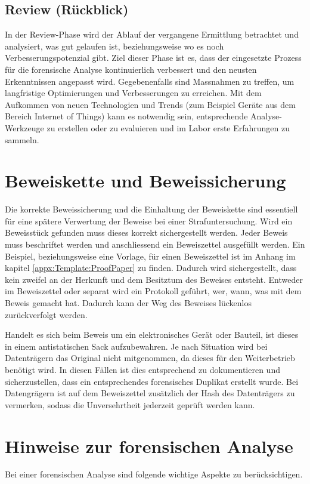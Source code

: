 \subsection{Review (Rückblick)}
In der Review-Phase wird der Ablauf der vergangene Ermittlung betrachtet und analysiert, was gut gelaufen ist, beziehungsweise wo es noch Verbesserungspotenzial gibt. Ziel dieser Phase ist es, dass der eingesetzte Prozess für die forensische Analyse kontinuierlich verbessert und den neusten Erkenntnissen angepasst wird. Gegebenenfalls sind Massnahmen zu treffen, um langfristige Optimierungen und Verbesserungen zu erreichen. Mit dem Aufkommen von neuen Technologien und Trends (zum Beispiel Geräte aus dem Bereich Internet of Things) kann es notwendig sein, entsprechende Analyse-Werkzeuge zu erstellen oder zu evaluieren und im Labor erste Erfahrungen zu sammeln.

\section{Beweiskette und Beweissicherung}
Die korrekte Beweissicherung und die Einhaltung der Beweiskette sind essentiell für eine spätere Verwertung der Beweise bei einer Strafuntersuchung. Wird ein Beweisstück gefunden muss dieses korrekt sichergestellt werden. Jeder Beweis muss beschriftet werden und anschliessend ein Beweiszettel ausgefüllt werden. Ein Beispiel, beziehungsweise eine Vorlage, für einen Beweiszettel ist im Anhang im kapitel \ref{appx:Template:ProofPaper}  zu finden. Dadurch wird sichergestellt, dass kein zweifel an der Herkunft und dem Besitztum des Beweises entsteht. Entweder im Beweiszettel oder separat wird ein Protokoll geführt, wer, wann, was mit dem Beweis gemacht hat. Dadurch kann der Weg des Beweises lückenlos zurückverfolgt werden.

Handelt es sich beim Beweis um ein elektronisches Gerät oder Bauteil, ist dieses in einem antistatischen Sack aufzubewahren. Je nach Situation wird bei Datenträgern das Original nicht mitgenommen, da dieses für den Weiterbetrieb benötigt wird. In diesen Fällen ist dies entsprechend zu dokumentieren und sicherzustellen, dass ein entsprechendes forensisches Duplikat erstellt wurde. Bei Datengrägern ist auf dem Beweiszettel zusätzlich der Hash des Datenträgers zu vermerken, sodass die Unversehrtheit jederzeit geprüft werden kann.


\section{Hinweise zur forensischen Analyse}
Bei einer forensischen Analyse sind folgende wichtige Aspekte zu berücksichtigen.

